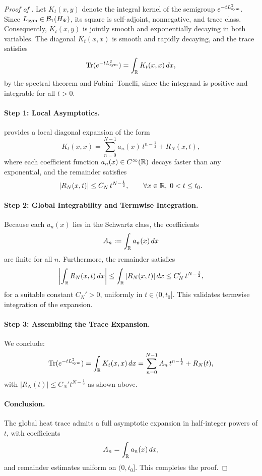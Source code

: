 \begin{proof}[Proof of ]
Let \( K_t(x,y) \) denote the integral kernel of the semigroup \( e^{-t L_{\mathrm{sym}}^2} \). Since \( L_{\mathrm{sym}} \in \mathcal{B}_1(H_{\Psi}) \), its square is self-adjoint, nonnegative, and trace class. Consequently, \( K_t(x,y) \) is jointly smooth and exponentially decaying in both variables. The diagonal \( K_t(x,x) \) is smooth and rapidly decaying, and the trace satisfies
\[
\operatorname{Tr}(e^{-t L_{\mathrm{sym}}^2}) = \int_{\mathbb{R}} K_t(x,x) \, dx,
\]
by the spectral theorem and Fubini--Tonelli, since the integrand is positive and integrable for all \( t > 0 \).

\paragraph{Step 1: Local Asymptotics.}
 provides a local diagonal expansion of the form
\[
K_t(x,x) = \sum_{n=0}^{N-1} a_n(x) \, t^{n - \frac{1}{2}} + R_N(x,t),
\]
where each coefficient function \( a_n(x) \in C^\infty(\mathbb{R}) \) decays faster than any exponential, and the remainder satisfies
\[
|R_N(x,t)| \leq C_N \, t^{N - \frac{1}{2}}, \qquad \forall x \in \mathbb{R}, \; 0 < t \leq t_0.
\]

\paragraph{Step 2: Global Integrability and Termwise Integration.}
Because each \( a_n(x) \) lies in the Schwartz class, the coefficients
\[
A_n := \int_{\mathbb{R}} a_n(x) \, dx
\]
are finite for all \( n \). Furthermore, the remainder satisfies
\[
\left| \int_{\mathbb{R}} R_N(x,t)\, dx \right| \leq \int_{\mathbb{R}} |R_N(x,t)| \, dx \leq C_N' \, t^{N - \frac{1}{2}},
\]
for a suitable constant \( C_N' > 0 \), uniformly in \( t \in (0, t_0] \). This validates termwise integration of the expansion.

\paragraph{Step 3: Assembling the Trace Expansion.}
We conclude:
\[
\operatorname{Tr}(e^{-t L_{\mathrm{sym}}^2}) = \int_{\mathbb{R}} K_t(x,x) \, dx = \sum_{n=0}^{N-1} A_n \, t^{n - \frac{1}{2}} + R_N(t),
\]
with \( |R_N(t)| \leq C_N' t^{N - \frac{1}{2}} \) as shown above.

\paragraph{Conclusion.}
The global heat trace admits a full asymptotic expansion in half-integer powers of \( t \), with coefficients
\[
A_n = \int_{\mathbb{R}} a_n(x) \, dx,
\]
and remainder estimates uniform on \( (0, t_0] \). This completes the proof.
\end{proof}
